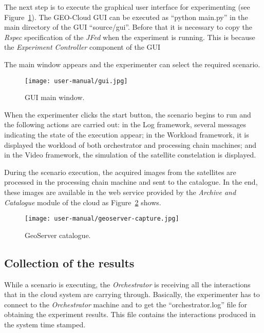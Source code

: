 The next step is to execute the graphical user interface for experimenting (see Figure~\ref{fig:gui}). The
GEO-Cloud \ac{GUI} can be executed as ``python main.py'' in the main directory of
the \ac{GUI} ``source/gui''. Before that it is necessary to copy the
\emph{Rspec} specification of the \emph{JFed} when the experiment is
running. This is because the \emph{Experiment Controller} component of the
\ac{GUI} 

The main window appears and the experimenter can select the required scenario.
\begin{figure}[!h]
\begin{center}
\texttt{[image: user-manual/gui.jpg]}
\caption{GUI main window.}
\label{fig:gui}
\end{center}
\end{figure}

When the experimenter clicks the start button, the scenario begins to run and
the following actions are carried out: in the Log framework, several messages indicating the state of the execution
appear; in the Workload framework, it is displayed the workload of both orchestrator and
processing chain machines; and in the Video framework, the simulation of the
satellite constelation is displayed.

During the scenario execution, the acquired images from the satellites are processed
in the processing chain machine and sent to the catalogue. 
In the end, these images are available
in the web service provided by the \emph{Archive and Catalogue} module of the
cloud as Figure~\ref{fig:images-catalogued} shows. 


\begin{figure}[!h]
\begin{center}
\texttt{[image: user-manual/geoserver-capture.jpg]}
\caption{GeoServer catalogue.}
\label{fig:images-catalogued}
\end{center}
\end{figure}


\subsection{Collection of the results}

While a scenario is executing, the \emph{Orchestrator} is receiving all the
interactions that in the cloud system are carrying through. 
Basically, the experimenter has to connect to the \emph{Orchestrator} machine
and to get the ``orchestrator.log'' file for obtaining the experiment results.
This file contains the interactions produced in the system time stamped.
